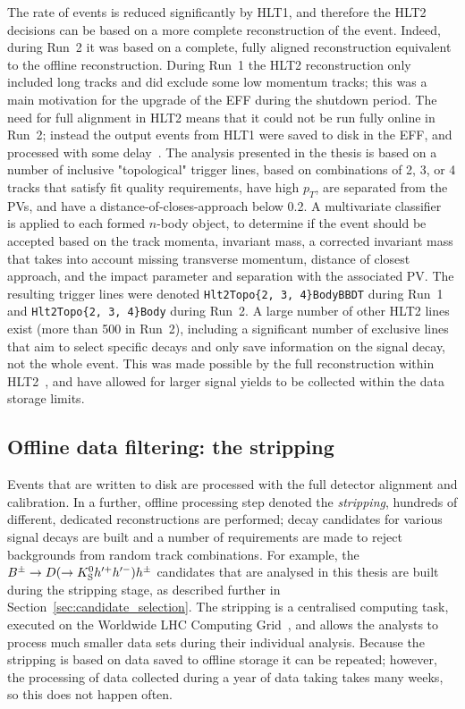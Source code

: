 The rate of events is reduced significantly by HLT1, and therefore the HLT2 decisions can be based on a more complete reconstruction of the event. Indeed, during Run~2 it was based on a complete, fully aligned reconstruction equivalent to the offline reconstruction. During Run~1 the HLT2 reconstruction only included long tracks and did exclude some low momentum tracks; this was a main motivation for the upgrade of the EFF during the shutdown period. The need for full alignment in HLT2 means that it could not be run fully online in Run~2; instead the output events from HLT1 were saved to disk in the EFF, and processed with some delay~\cite{Trigger-Performance2}. The analysis presented in the thesis is based on a number of inclusive "topological" trigger lines, based on combinations of 2, 3, or 4 tracks that satisfy fit quality requirements, have high $p_T$, are separated from the PVs, and have a distance-of-closes-approach below 0.2\mm. A multivariate classifier~\cite{gligorovEfficientReliableFast2013} is applied to each formed $n$-body object, to determine if the event should be accepted based on the track momenta, invariant mass, a corrected invariant mass that takes into account missing transverse momentum, distance of closest approach, and the impact parameter and separation with the associated PV. The resulting trigger lines were denoted \texttt{Hlt2Topo\{2, 3, 4\}BodyBBDT} during Run~1 and \texttt{Hlt2Topo\{2, 3, 4\}Body} during Run~2.  A large number of other HLT2 lines exist (more than 500 in Run~2), including a significant number of exclusive lines that aim to select specific decays and only save information on the signal decay, not the whole event. This was made possible by the full reconstruction within HLT2~\cite{Trigger-Performance2}, and have allowed for larger signal yields to be collected within the data storage limits.


\subsection{Offline data filtering: the \lhcb stripping} %
\label{sub:offline_data_filtering_the_lhcb_stripping}

Events that are written to disk are processed with the full detector alignment and calibration. In a further, offline processing step denoted the \emph{stripping}, hundreds of different, dedicated reconstructions are performed; decay candidates for various signal decays are built and a number of requirements are made to reject backgrounds from random track combinations. For example, the ${{B}^\pm}\rightarrow{\ensuremath{D}}(\rightarrow{\ensuremath{{K}^0_{\mathrm{S}}}} h'^+h'^-)h^\pm$ candidates that are analysed in this thesis are built during the stripping stage, as described further in Section~\ref{sec:candidate_selection}. The stripping is a centralised computing task, executed on the Worldwide LHC Computing Grid~\cite{birdComputingLargeHadron2011a}, and allows the analysts to process much smaller data sets during their individual analysis. Because the stripping is based on data saved to offline storage it can be repeated; however, the processing of data collected during a year of data taking takes many weeks, so this does not happen often.

